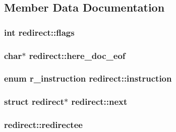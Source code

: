\subsection{Member Data Documentation}
\subsubsection[{\texorpdfstring{flags}{flags}}]{\setlength{\rightskip}{0pt plus 5cm}int redirect\+::flags}\hypertarget{structredirect_a9328e6f00bf0e9d9d08ecacba6374df8}{}\label{structredirect_a9328e6f00bf0e9d9d08ecacba6374df8}
\subsubsection[{\texorpdfstring{here\+\_\+doc\+\_\+eof}{here_doc_eof}}]{\setlength{\rightskip}{0pt plus 5cm}char$\ast$ redirect\+::here\+\_\+doc\+\_\+eof}\hypertarget{structredirect_a3185120aafa79b4c48824283a3021e63}{}\label{structredirect_a3185120aafa79b4c48824283a3021e63}
\subsubsection[{\texorpdfstring{instruction}{instruction}}]{\setlength{\rightskip}{0pt plus 5cm}enum {\bf r\+\_\+instruction} redirect\+::instruction}\hypertarget{structredirect_a81e943ca1372e74ad5ab23a22f9e8beb}{}\label{structredirect_a81e943ca1372e74ad5ab23a22f9e8beb}
\subsubsection[{\texorpdfstring{next}{next}}]{\setlength{\rightskip}{0pt plus 5cm}struct {\bf redirect}$\ast$ redirect\+::next}\hypertarget{structredirect_ae7bbd7429c76ca31edcdc88e43fd2408}{}\label{structredirect_ae7bbd7429c76ca31edcdc88e43fd2408}
\subsubsection[{\texorpdfstring{redirectee}{redirectee}}]{ redirect\+::redirectee}\hypertarget{structredirect_a484dd470583ad862e00d2d738a9f7e93}{}\label{structredirect_a484dd470583ad862e00d2d738a9f7e93}
